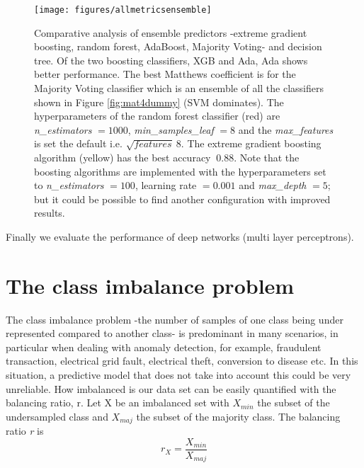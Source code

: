 \documentclass[11pt]{article}
\theoremstyle{definition}
\theoremstyle{remark}
\begin{document}
\begin{figure}[H] 
        \centering
        \texttt{[image: figures/allmetricsensemble]}
        \caption{Comparative analysis of ensemble predictors -extreme gradient boosting, random forest, AdaBoost, Majority Voting- and decision tree. Of the two boosting classifiers, XGB and Ada, Ada shows better performance. The best Matthews coefficient is for the Majority Voting classifier which is an ensemble of all the classifiers shown in Figure \ref{fig:mat4dummy} (SVM dominates). The hyperparameters of the random forest classifier (red) are \textit{n\_estimators} $= 1000$, \textit{min\_samples\_leaf} $= 8$ and the \textit{max\_features} is set the default i.e. $\sqrt{features}~8$. The extreme gradient boosting algorithm (yellow) has the best accuracy $~0.88$. Note that the boosting algorithms are implemented with the hyperparameters set to \textit{n\_estimators} $= 100$, learning rate $=0.001$ and \textit{max\_depth} $=5$; but it could be possible to find another configuration with improved results.} \label{fig:allmetricsensemble}
\end{figure}

Finally we evaluate the performance of deep networks (multi layer perceptrons).


\section{The class imbalance problem}
\label{se:imbalance}
The class imbalance problem -the number of samples of one class being under represented compared to another class- is predominant in many scenarios, in particular when dealing with anomaly detection, for example, fraudulent transaction, electrical grid fault, electrical theft, conversion to disease  etc. In this situation, a predictive model that does not take into account this could be very unreliable.
How imbalanced is our data set can be easily quantified with the balancing ratio, r. Let X be an imbalanced set with $X_{min}$ the subset of the undersampled class and $X_{maj}$ the subset of the majority class. The balancing ratio \emph{r} is
\begin{equation}
r_X = \frac{X_{min}}{X_{maj}}
\end{equation}
\end{document}
